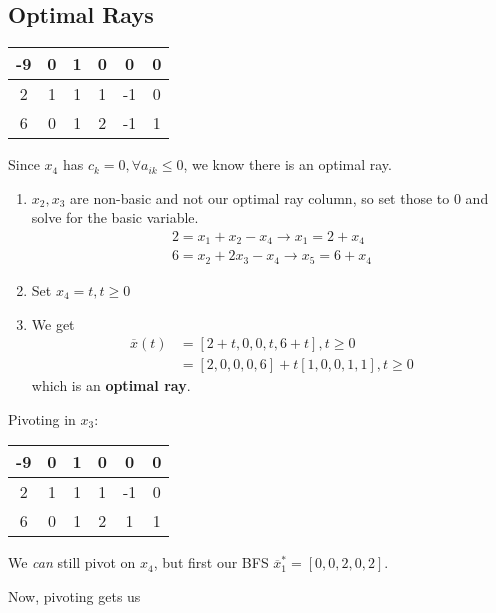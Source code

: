 \documentclass[10pt]{article}
\begin{document}
\begin{multicols*}{2}
    \begin{minipage}{\columnwidth}
        \subsection*{Optimal Rays}
        \begin{tabular}{c|ccccc}
            -9 & 0 & 1 & 0 & 0  & 0 \\
            \hline
            2  & 1 & 1 & 1 & -1 & 0 \\
            6  & 0 & 1 & 2 & -1 & 1
        \end{tabular}
        \columnbreak
        Since \(x_4\) has \(c_k = 0, \forall a_{ik} \leq 0\), we know there is an optimal ray.
        \begin{enumerate}
            \item \(x_2, x_3\) are non-basic and not our optimal ray column, so set those to 0 and solve for the basic variable.
                  \begin{align*}
                      2 = x_1 + x_2 -x_4 \rightarrow x_1 = 2 + x_4 \\
                      6 = x_2 + 2x_3 - x_4 \rightarrow x_5 = 6 + x_4
                  \end{align*}
            \item Set \(x_4 = t, t \geq 0\)
            \item We get
                  \begin{align*}
                      \overline{x}(t) & = [2 + t, 0, 0, t, 6 + t], t \geq 0             \\
                                      & = [2, 0, 0, 0, 6] + t [1, 0, 0, 1, 1], t \geq 0
                  \end{align*}
                  which is an \textbf{optimal ray}.
        \end{enumerate}
        Pivoting in \(x_3\):

        \begin{tabular}{c|ccccc}
            -9 & 0 & 1 & 0 & 0  & 0 \\
            \hline
            2  & 1 & 1 & 1 & -1 & 0 \\
            6  & 0 & 1 & 2 & 1  & 1
        \end{tabular}
        We \textit{can} still pivot on \(x_4\), but first our BFS \(\overline{x}_1^* = [0, 0, 2, 0, 2]\).

        Now, pivoting gets us


\end{minipage}
\end{multicols*}
\end{document}
